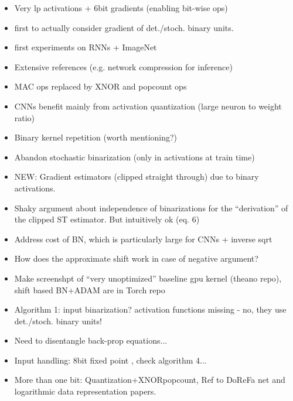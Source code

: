 \documentclass{article}
\begin{document}
    \begin{itemize}
        \item Very lp activations + 6bit gradients (enabling bit-wise ops)
        \item first to actually consider gradient of det./stoch. binary units.
        \item first experiments on RNNs + ImageNet
        \item Extensive references (e.g. network compression for inference)
        \item MAC ops replaced by XNOR and popcount ops
        \item CNNs benefit mainly from activation quantization (large neuron to
        weight ratio)
        \item Binary kernel repetition (worth mentioning?)
        \item Abandon stochastic binarization (only in activations at train time)
        \item NEW: Gradient estimators (clipped straight through) due to binary
        activations.
        \item Shaky argument about independence of binarizations for the
        ``derivation'' of the clipped ST estimator. But intuitively ok (eq. 6)
        \item Address cost of BN, which is particularly large for CNNs + inverse sqrt
        \item How does the approximate shift work in case of negative argument?
        \item Make screenshpt of ``very unoptimized'' baseline gpu kernel (theano repo),
        shift based BN+ADAM are in Torch repo
        \item Algorithm 1: input binarization? activation functions missing - no,
        they use det./stoch. binary units!
        \item Need to disentangle back-prop equations...
        \item Input handling: 8bit fixed point , check algorithm 4...
        \item More than one bit: Quantization+XNORpopcount, Ref to DoReFa net and
        logarithmic data representation papers.
    \end{itemize}
\end{document}
